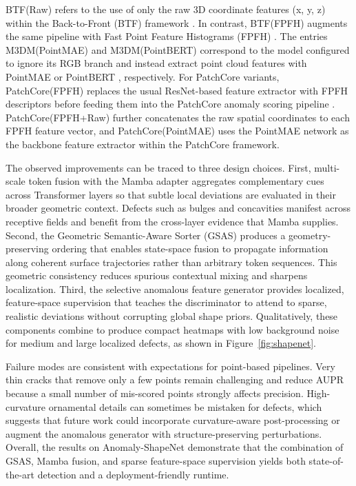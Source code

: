 BTF(Raw) refers to the use of only the raw 3D coordinate features (x, y, z) within the Back-to-Front (BTF) framework \cite{horwitz2023back}. In contrast, BTF(FPFH) augments the same pipeline with Fast Point Feature Histograms (FPFH) \cite{rusu2009fast}. The entries M3DM(PointMAE) and M3DM(PointBERT) correspond to the model \cite{wang2023multimodal} configured to ignore its RGB branch and instead extract point cloud features with PointMAE \cite{pang2022masked} or PointBERT \cite{yu2022point}, respectively. For PatchCore variants, PatchCore(FPFH) replaces the usual ResNet-based feature extractor with FPFH descriptors \cite{rusu2009fast} before feeding them into the PatchCore anomaly scoring pipeline \cite{roth2022towards}. PatchCore(FPFH+Raw) further concatenates the raw spatial coordinates to each FPFH feature vector, and PatchCore(PointMAE) uses the PointMAE network \cite{pang2022masked} as the backbone feature extractor within the PatchCore framework.

The observed improvements can be traced to three design choices. First, multi-scale token fusion with the Mamba adapter aggregates complementary cues across Transformer layers so that subtle local deviations are evaluated in their broader geometric context. Defects such as bulges and concavities manifest across receptive fields and benefit from the cross-layer evidence that Mamba supplies. Second, the Geometric Semantic-Aware Sorter (GSAS) produces a geometry-preserving ordering that enables state-space fusion to propagate information along coherent surface trajectories rather than arbitrary token sequences. This geometric consistency reduces spurious contextual mixing and sharpens localization. Third, the selective anomalous feature generator provides localized, feature-space supervision that teaches the discriminator to attend to sparse, realistic deviations without corrupting global shape priors. Qualitatively, these components combine to produce compact heatmaps with low background noise for medium and large localized defects, as shown in Figure~\ref{fig:shapenet}.

Failure modes are consistent with expectations for point-based pipelines. Very thin cracks that remove only a few points remain challenging and reduce AUPR because a small number of mis-scored points strongly affects precision. High-curvature ornamental details can sometimes be mistaken for defects, which suggests that future work could incorporate curvature-aware post-processing or augment the anomalous generator with structure-preserving perturbations. Overall, the results on Anomaly-ShapeNet demonstrate that the combination of GSAS, Mamba fusion, and sparse feature-space supervision yields both state-of-the-art detection and a deployment-friendly runtime.

